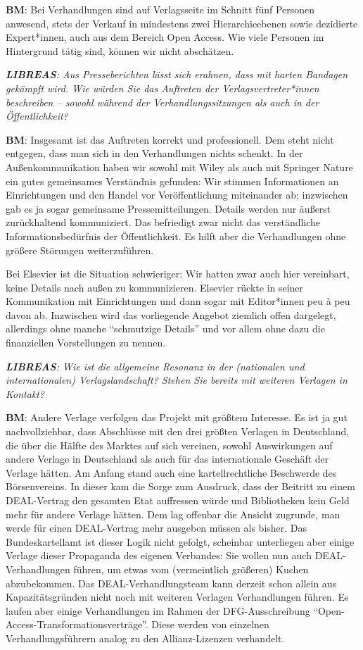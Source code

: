\documentclass[a4paper,
fontsize=11pt,
oneside,
numbers=noperiodatend,
parskip=half-,
bibliography=totoc,
final
]{scrartcl}
\begin{document}
\textbf{BM}: Bei Verhandlungen sind auf Verlagsseite im Schnitt fünf
Personen anwesend, stets der Verkauf in mindestens zwei Hierarchieebenen
sowie dezidierte Expert*innen, auch aus dem Bereich Open Access. Wie
viele Personen im Hintergrund tätig sind, können wir nicht abschätzen.

\emph{\textbf{LIBREAS}: Aus Presseberichten lässt sich erahnen, dass mit
harten Bandagen gekämpft wird. Wie würden Sie das Auftreten der
Verlagsvertreter*innen beschreiben -- sowohl während der
Verhandlungssitzungen als auch in der Öffentlichkeit?}

\textbf{BM}: Insgesamt ist das Auftreten korrekt und professionell. Dem
steht nicht entgegen, dass man sich in den Verhandlungen nichts schenkt.
In der Außenkommunikation haben wir sowohl mit Wiley als auch mit
Springer Nature ein gutes gemeinsames Verständnis gefunden: Wir stimmen
Informationen an Einrichtungen und den Handel vor Veröffentlichung
miteinander ab; inzwischen gab es ja sogar gemeinsame
Pressemitteilungen. Details werden nur äußerst zurückhaltend
kommuniziert. Das befriedigt zwar nicht das verständliche
Informationsbedürfnis der Öffentlichkeit. Es hilft aber die
Verhandlungen ohne größere Störungen weiterzuführen.

Bei Elsevier ist die Situation schwieriger: Wir hatten zwar auch hier
vereinbart, keine Details nach außen zu kommunizieren. Elsevier rückte
in seiner Kommunikation mit Einrichtungen und dann sogar mit
Editor*innen peu à peu davon ab. Inzwischen wird das vorliegende Angebot
ziemlich offen dargelegt, allerdings ohne manche \enquote{schmutzige
Details} und vor allem ohne dazu die finanziellen Vorstellungen zu
nennen.

\emph{\textbf{LIBREAS}: Wie ist die allgemeine Resonanz in der
(nationalen und internationalen) Verlagslandschaft? Stehen Sie bereits
mit weiteren Verlagen in Kontakt?}

\textbf{BM}: Andere Verlage verfolgen das Projekt mit größtem Interesse.
Es ist ja gut nachvollziehbar, dass Abschlüsse mit den drei größten
Verlagen in Deutschland, die über die Hälfte des Marktes auf sich
vereinen, sowohl Auswirkungen auf andere Verlage in Deutschland als auch
für das internationale Geschäft der Verlage hätten. Am Anfang stand auch
eine kartellrechtliche Beschwerde des Börsenvereins. In dieser kam die
Sorge zum Ausdruck, dass der Beitritt zu einem DEAL-Vertrag den gesamten
Etat auffressen würde und Bibliotheken kein Geld mehr für andere Verlage
hätten. Dem lag offenbar die Ansicht zugrunde, man werde für einen
DEAL-Vertrag mehr ausgeben müssen als bisher. Das Bundeskartellamt ist
dieser Logik nicht gefolgt, scheinbar unterliegen aber einige Verlage
dieser Propaganda des eigenen Verbandes: Sie wollen nun auch
DEAL-Verhandlungen führen, um etwas vom (vermeintlich größeren) Kuchen
abzubekommen. Das DEAL-Verhandlungsteam kann derzeit schon allein aus
Kapazitätsgründen nicht noch mit weiteren Verlagen Verhandlungen führen.
Es laufen aber einige Verhandlungen im Rahmen der DFG-Ausschreibung
\enquote{Open-Access-Transformationsverträge}. Diese werden von
einzelnen Verhandlungsführern analog zu den Allianz-Lizenzen verhandelt.
\end{document}
